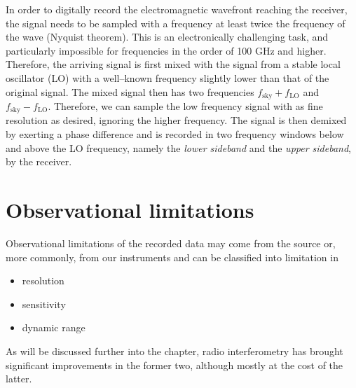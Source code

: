 \documentclass[a4wide,12pt]{book}
\begin{document}
{%


In order to digitally record the electromagnetic wavefront reaching the receiver, the signal needs to be sampled with a frequency at least twice the frequency of the wave (Nyquist theorem). This is an electronically challenging task, and particularly impossible for frequencies in the order of 100 GHz and higher. Therefore, the arriving signal is first mixed with the signal from a stable local oscillator (LO) with a well--known frequency slightly lower than that of the original signal. The mixed signal then has two frequencies $f_\mathrm{sky} + f_\mathrm{LO}$ and $f_\mathrm{sky} - f_\mathrm{LO}$. Therefore, we can sample the low frequency signal with as fine resolution as desired, ignoring the higher frequency. The signal is then demixed by exerting a phase difference and is recorded in two frequency windows below and above the LO frequency, namely the \emph{lower sideband} and the \emph{upper sideband}, by the receiver.

\section{Observational limitations}
Observational limitations of the recorded data may come from the source or, more commonly, from our instruments and can be classified into limitation in 
\begin{itemize}
\item resolution
\item sensitivity
\item dynamic range
\end{itemize}
As will be discussed further into the chapter, radio interferometry has brought significant improvements in the former two, although mostly at the cost of the latter.

}
\end{document}
